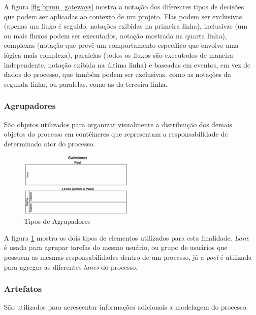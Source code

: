     A figura \ref{fig:bpmn_gateways} mostra a notação dos diferentes tipos de decisões que podem ser aplicadas ao contexto de um projeto. Elas podem ser exclusivas (apenas um fluxo é seguido, notações exibidas na primeira linha), inclusivas (um ou mais fluxos podem ser executados, notação mostrada na quarta linha), complexas (notação que prevê um comportamento específico que envolve uma lógica mais complexa), paralelas (todos os fluxos são executados de maneira independente, notação exibida na última linha) e baseadas em eventos, em vez de dados do processo, que também podem ser exclusivas, como as notações da segunda linha, ou paralelas, como as da terceira linha.


\subsubsection{Agrupadores}\label{sec:bpm-bpmn_objetos_agrupadores}

    São objetos utilizados para organizar visualmente a distribuição dos demais objetos do processo em contêineres que representam a responsabilidade de determinado ator do processo.

    \begin{figure}[H]
    \centering
    \includegraphics[width=0.5\textwidth]{imagens/bpmn_swimlanes.jpg}
    \caption{Tipos de Agrupadores\cite{tipos_agrupadores}}
    \label{fig:bpmn_swimlanes}
    \end{figure}
    
    A figura \ref{fig:bpmn_swimlanes} mostra os dois tipos de elementos utilizados para esta finalidade. \textit{Lane} é usada para agrupar tarefas do mesmo usuário, ou grupo de usuários que possuem as mesmas responsabilidades dentro de um processo, já a \textit{pool} é utilizada para agregar as diferentes \textit{lanes} do processo. 

\subsubsection{Artefatos}\label{sec:bpm-bpmn_objetos_artefatos}

    São utilizados para acrescentar informações adicionais a modelagem do processo. 

